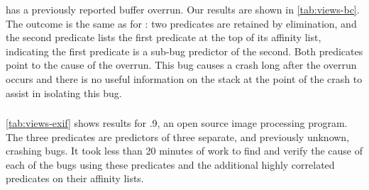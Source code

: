  has a previously reported buffer overrun.  Our results are shown in \autoref{tab:views-bc}.
The outcome is the same as for \ccrypt: two predicates are retained by elimination, and the second
predicate lists the first predicate at the top of its affinity list, indicating the first predicate
is a sub-bug predictor of the second.  Both predicates point to the cause of the overrun.  
This bug causes a crash long after the overrun occurs and there is no useful
information on the stack at the point of the crash to assist in isolating this bug.

\subsubsection{\exif}

\autoref{tab:views-exif} shows results for .9, an open source image processing program.
The three predicates are predictors of three separate, and previously unknown, crashing bugs.  It took less
than 20 minutes of work to find and verify the cause of each of the bugs using these predicates
and the additional highly correlated predicates on their affinity lists.

